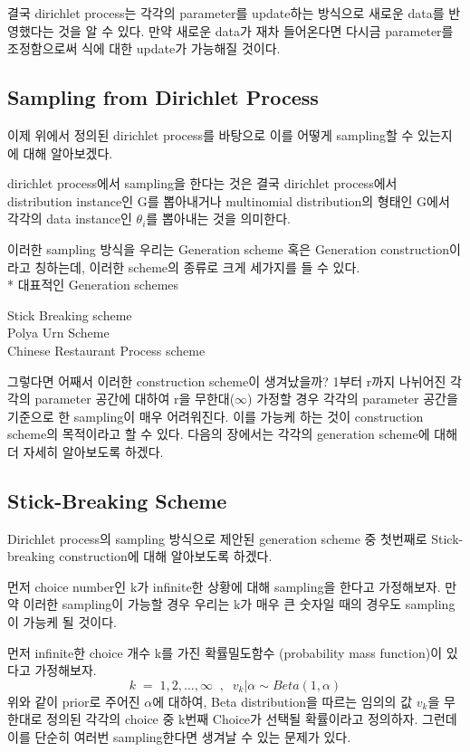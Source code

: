 \documentclass[a4paper]{oblivoir}
\begin{document}
결국 dirichlet process는 각각의 parameter를 update하는 방식으로 새로운 data를 반영했다는 것을 알 수 있다. 만약 새로운 data가 재차 들어온다면 다시금 parameter를 조정함으로써 식에 대한 update가 가능해질 것이다. 

\subsection{Sampling from Dirichlet Process}
이제 위에서 정의된 dirichlet process를 바탕으로 이를 어떻게 sampling할 수 있는지에 대해 알아보겠다.

dirichlet process에서 sampling을 한다는 것은 결국 dirichlet process에서 distribution instance인 G를 뽑아내거나 multinomial distribution의 형태인 G에서 각각의 data instance인 $\theta_{i}$를 뽑아내는 것을 의미한다. 

이러한 sampling 방식을 우리는 Generation scheme 혹은 Generation construction이라고 칭하는데, 이러한 scheme의 종류로 크게 세가지를 들 수 있다.\\
* 대표적인 Generation schemes
\begin{center}
Stick Breaking scheme\\
Polya Urn Scheme\\
Chinese Restaurant Process scheme\\
\end{center}

그렇다면 어째서 이러한 construction scheme이 생겨났을까?  1부터 r까지 나뉘어진 각각의 parameter 공간에 대하여 r을 무한대($\infty$) 가정할 경우 각각의 parameter 공간을 기준으로 한 sampling이 매우 어려워진다. 이를 가능케 하는 것이 construction scheme의 목적이라고 할 수 있다. 다음의 장에서는 각각의 generation scheme에 대해 더 자세히 알아보도록 하겠다. 

\subsection{Stick-Breaking Scheme}
Dirichlet process의 sampling 방식으로 제안된 generation scheme 중 첫번째로 Stick-breaking construction에 대해 알아보도록 하겠다.

먼저 choice number인 k가 infinite한 상황에 대해 sampling을 한다고 가정해보자. 만약 이러한 sampling이 가능할 경우 우리는 k가 매우 큰 숫자일 때의 경우도 sampling이 가능케 될 것이다.

먼저 infinite한 choice 개수 k를 가진 확률밀도함수 (probability mass function)이 있다고 가정해보자. 
\begin{equation}
k\;=\;1,2,...,\infty\;\;,\;\;v_{k}|\alpha \sim Beta(1,\alpha)
\end{equation}
위와 같이 prior로 주어진 $\alpha$에 대하여, Beta distribution을 따르는 임의의 값 $v_{k}$을 무한대로 정의된 각각의 choice 중 k번째 Choice가 선택될 확률이라고 정의하자. 그런데 이를 단순히 여러번 sampling한다면 생겨날 수 있는 문제가 있다.
\end{document}
